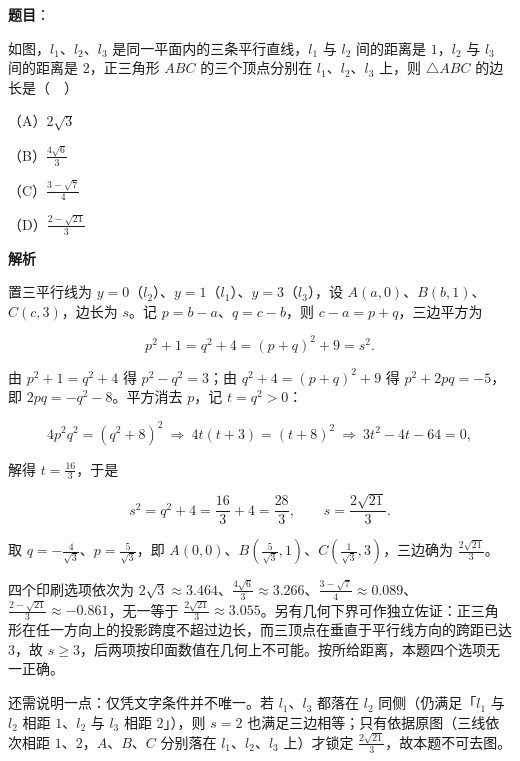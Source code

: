 \begin{answer}

\textbf{题目}：

如图，$l_1$、$l_2$、$l_3$ 是同一平面内的三条平行直线，$l_1$ 与 $l_2$ 间的距离是 $1$，$l_2$ 与 $l_3$ 间的距离是 $2$，正三角形 $ABC$ 的三个顶点分别在 $l_1$、$l_2$、$l_3$ 上，则 $\triangle ABC$ 的边长是（　）
\nopagebreak[4]
\begin{center}\end{center}
\nopagebreak[4]
（A）$2\sqrt3$

（B）$\frac{4\sqrt6}{3}$

（C）$\frac{3-\sqrt7}{4}$

（D）$\frac{2-\sqrt{21}}{3}$

\textbf{解析}

置三平行线为 $y=0$（$l_2$）、$y=1$（$l_1$）、$y=3$（$l_3$），设 $A(a,0)$、$B(b,1)$、$C(c,3)$，边长为 $s$。记 $p=b-a$、$q=c-b$，则 $c-a=p+q$，三边平方为

\nopagebreak[4]
\[p^{2}+1=q^{2}+4=(p+q)^{2}+9=s^{2}.\]

由 $p^{2}+1=q^{2}+4$ 得 $p^{2}-q^{2}=3$；由 $q^{2}+4=(p+q)^{2}+9$ 得 $p^{2}+2pq=-5$，即 $2pq=-q^{2}-8$。平方消去 $p$，记 $t=q^{2}>0$：

\nopagebreak[4]
\[4p^{2}q^{2}=(q^{2}+8)^{2}\ \Longrightarrow\ 4t(t+3)=(t+8)^{2}\ \Longrightarrow\ 3t^{2}-4t-64=0,\]

解得 $t=\frac{16}{3}$，于是

\nopagebreak[4]
\[s^{2}=q^{2}+4=\frac{16}{3}+4=\frac{28}{3},\qquad s=\frac{2\sqrt{21}}{3}.\]

取 $q=-\frac{4}{\sqrt3}$、$p=\frac{5}{\sqrt3}$，即 $A(0,0)$、$B\left(\frac{5}{\sqrt3},1\right)$、$C\left(\frac{1}{\sqrt3},3\right)$，三边确为 $\frac{2\sqrt{21}}{3}$。

四个印刷选项依次为 $2\sqrt3\approx3.464$、$\frac{4\sqrt6}{3}\approx3.266$、$\frac{3-\sqrt7}{4}\approx0.089$、$\frac{2-\sqrt{21}}{3}\approx-0.861$，无一等于 $\frac{2\sqrt{21}}{3}\approx3.055$。另有几何下界可作独立佐证：正三角形在任一方向上的投影跨度不超过边长，而三顶点在垂直于平行线方向的跨距已达 $3$，故 $s\geqslant3$，后两项按印面数值在几何上不可能。按所给距离，本题四个选项无一正确。

还需说明一点：仅凭文字条件并不唯一。若 $l_1$、$l_3$ 都落在 $l_2$ 同侧（仍满足「$l_1$ 与 $l_2$ 相距 $1$、$l_2$ 与 $l_3$ 相距 $2$」），则 $s=2$ 也满足三边相等；只有依据原图（三线依次相距 $1$、$2$，$A$、$B$、$C$ 分别落在 $l_1$、$l_2$、$l_3$ 上）才锁定 $\frac{2\sqrt{21}}{3}$，故本题不可去图。


\end{answer}
